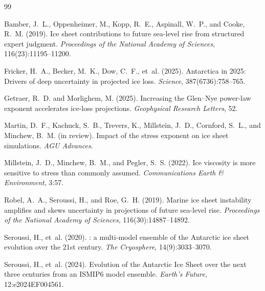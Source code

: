 \documentclass[11pt]{article}
\begin{document}

\begin{thebibliography}{99}

Bamber, J.~L., Oppenheimer, M., Kopp, R.~E., Aspinall, W.~P., and Cooke, R.~M. (2019).
\newblock Ice sheet contributions to future sea-level rise from structured expert judgment.
\newblock \textit{Proceedings of the National Academy of Sciences}, 116(23):11195--11200.

Fricker, H.~A., Becker, M.~K., Dow, C.~F., et~al. (2025).
\newblock Antarctica in 2025: Drivers of deep uncertainty in projected ice loss.
\newblock \textit{Science}, 387(6736):758--765.

Getraer, R.~D. and Morlighem, M. (2025).
\newblock Increasing the {G}len--{N}ye power-law exponent accelerates ice-loss projections.
\newblock \textit{Geophysical Research Letters}, 52.

Martin, D.~F., Kachuck, S.~B., Trevers, K., Millstein, J.~D., Cornford, S.~L., and Minchew, B.~M. (in review).
\newblock Impact of the stress exponent on ice sheet simulations.
\newblock \textit{AGU Advances}.

Millstein, J.~D., Minchew, B.~M., and Pegler, S.~S. (2022).
\newblock Ice viscosity is more sensitive to stress than commonly assumed.
\newblock \textit{Communications Earth \& Environment}, 3:57.

Robel, A.~A., Seroussi, H., and Roe, G.~H. (2019).
\newblock Marine ice sheet instability amplifies and skews uncertainty in projections of future sea-level rise.
\newblock \textit{Proceedings of the National Academy of Sciences}, 116(30):14887--14892.

Seroussi, H., et~al. (2020).
: a multi-model ensemble of the {A}ntarctic ice sheet evolution over the 21st century.
\newblock \textit{The Cryosphere}, 14(9):3033--3070.

Seroussi, H., et~al. (2024).
\newblock Evolution of the {A}ntarctic Ice Sheet over the next three centuries from an {ISMIP6} model ensemble.
\newblock \textit{Earth's Future}, 12:e2024EF004561.

\end{thebibliography}
\end{document}
